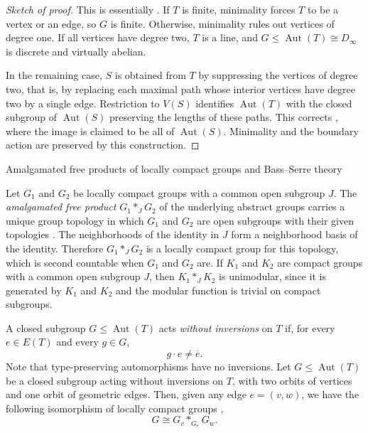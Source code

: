 \documentclass[11pt]{amsart}
\makeatletter
\numberwithin{equation}{section}
\def\subsection{\@startsection{subsection}{2}%
  \z@{.7\linespacing\@plus.7\linespacing}{.3\linespacing}%
  {\normalfont\bfseries}}
\DeclareMathOperator{\Aut}{Aut}
\theoremstyle{definition}
\makeatother
\begin{document}
\begin{proof}[Sketch of proof]
    This is essentially \cite[Lemma~5.2]{HR19}. If $T$ is finite, minimality forces $T$ to be a vertex or an edge, so $G$ is finite. Otherwise, minimality rules out vertices of degree one. If all vertices have degree two, $T$ is a line, and $G\leq\Aut(T)\cong D_\infty$ is discrete and virtually abelian.

    In the remaining case, $S$ is obtained from $T$ by suppressing the vertices of degree two, that is, by replacing each maximal path whose interior vertices have degree two by a single edge. Restriction to $V(S)$ identifies $\Aut(T)$ with the closed subgroup of $\Aut(S)$ preserving the lengths of these paths. This corrects \cite[Lemma~5.2]{HR19}, where the image is claimed to be all of $\Aut(S)$. Minimality and the boundary action are preserved by this construction.
\end{proof}

\subsection{Amalgamated free products of locally compact groups and Bass--Serre theory}
\label{subsec:prelim-bass-serre}

Let $G_1$ and $G_2$ be locally compact groups with a common open subgroup $J$. The \emph{amalgamated free product $G_1\ast_JG_2$} of the underlying abstract groups carries a unique group topology in which $G_1$ and $G_2$ are open subgroups with their given topologies \cite[Section~2.4]{HR19}. The neighborhoods of the identity in $J$ form a neighborhood basis of the identity. Therefore $G_1\ast_JG_2$ is a locally compact group for this topology, which is second countable when $G_1$ and $G_2$ are. If $K_1$ and $K_2$ are compact groups with a common open subgroup $J$, then $K_1\ast_JK_2$ is unimodular, since it is generated by $K_1$ and $K_2$ and the modular function is trivial on compact subgroups.


A closed subgroup $G\leq \Aut(T)$ acts \emph{without inversions} on $T$ if, for every $e\in E(T)$ and every $g\in G$,
$$ g\cdot e\neq \overline{e}.$$
Note that type-preserving automorphisms have no inversions. Let $G\leq \Aut(T)$ be a closed subgroup acting without inversions on $T$, with two orbits of vertices and one orbit of geometric edges. Then, given any edge $e=(v,w)$, we have the following isomorphism of locally compact groups \cite[Chapter~I, Section~4.1, Theorem~6]{Serre80}, \cite[Section~2.4]{HR19} 
$$ G\cong G_{v}\ast_{G_e}G_{w}.$$
\end{document}
